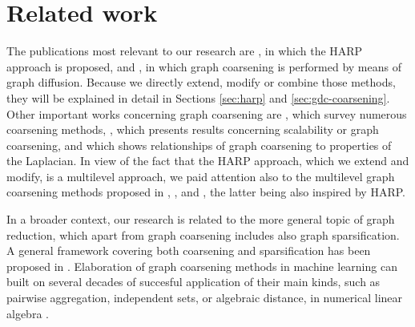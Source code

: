\section{Related work}

The publications most relevant to our research are \cite{chen_harp_2018}, in which the HARP approach is proposed, and \cite{gasteiger_diffusion_2019}, in which graph coarsening is performed by means of graph diffusion. Because we directly extend, modify or combine those methods, they will be explained in detail in Sections \ref{sec:harp} and \ref{sec:gdc-coarsening}. Other important works concerning graph coarsening are \cite{akyildiz_understanding_2020, chen_graph_2022}, which survey numerous coarsening methods, \cite{huang_scaling_2021}, which presents results concerning scalability or graph coarsening, and \cite{loukas_graph_2019} which shows relationships of graph coarsening to properties of the Laplacian. In view of the fact that the HARP approach, which we extend and modify, is a multilevel approach, we paid attention also to the multilevel graph coarsening methods proposed in \cite{xie_graph_2020}, \cite{deng_graphzoom_2020}, \cite{cai_graph_2022} and \cite{zhang_harp_2021}, the latter being also inspired by HARP.

In a broader context, our research is related to the more general topic of graph reduction, which apart from graph coarsening includes also graph sparsification. A general framework covering both coarsening and sparsification has been proposed in \cite{bravo_hermsdorff_unifying_2019}. Elaboration of graph coarsening methods in machine learning can built on several decades of succesful application of their main kinds, such as pairwise aggregation, independent sets, or algebraic distance, in numerical linear algebra \cite{chen_graph_2022}.
